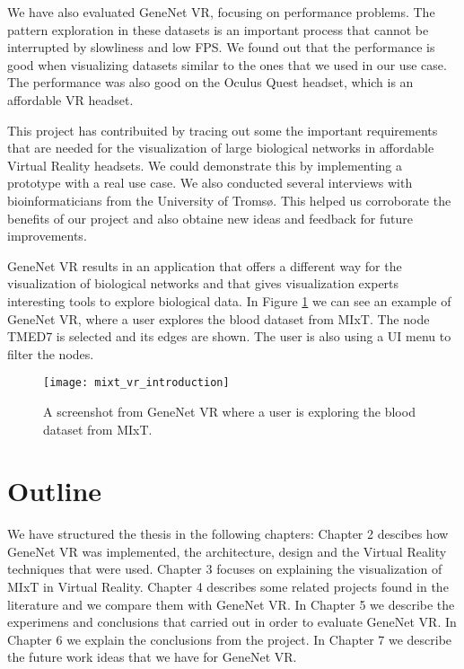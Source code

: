 We have also evaluated GeneNet VR, focusing on performance problems. The pattern exploration in these datasets is an important process that cannot be interrupted by slowliness and low FPS. We found out that the performance is good when visualizing datasets similar to the ones that we used in our use case. The performance was also good on the Oculus Quest headset, which is an affordable VR headset.

This project has contribuited by tracing out some the important requirements that are needed for the visualization of large biological networks in affordable Virtual Reality headsets. We could demonstrate this by implementing a prototype with a real use case. We also conducted several interviews with bioinformaticians from the University of Troms\o. This helped us corroborate the benefits of our project and also obtaine new ideas and feedback for future improvements.

GeneNet VR results in an application that offers a different way for the visualization of biological networks and that gives visualization experts interesting tools to explore biological data. In Figure \ref{fig:bignet_intro} we can see an example of GeneNet VR, where a user explores the blood dataset from MIxT. The node TMED7 is selected and its edges are shown. The user is also using a UI menu to filter the nodes.

\begin{figure}[h!]
    \newlength{\tempheight}
    \setlength{\tempheight}{15ex}
    \centering
    \texttt{[image: mixt\_vr\_introduction]}
    \caption{A screenshot from GeneNet VR where a user is exploring the blood dataset from MIxT.}
    \label{fig:bignet_intro}
\end{figure}

\section{Outline}

We have structured the thesis in the following chapters: Chapter 2 descibes how GeneNet VR was implemented, the architecture, design and the Virtual Reality techniques that were used. Chapter 3 focuses on explaining the visualization of MIxT in Virtual Reality. Chapter 4 describes some related projects found in the literature and we compare them with GeneNet VR. In Chapter 5 we describe the experimens and conclusions that carried out in order to evaluate GeneNet VR. In Chapter 6 we explain the conclusions from the project. In Chapter 7 we describe the future work ideas that we have for GeneNet VR.
